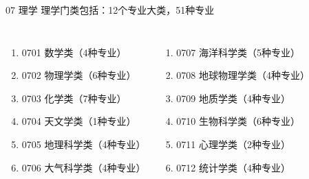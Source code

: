 \documentclass[aspectratio=169]{ctexbeamer} %
\begin{document}
\begin{frame}[t]{07 理学}
理学门类包括：12个专业大类，51种专业 \\

\begin{spacing}{1.2} %
\begin{columns}
{\large
\begin{enumerate}[label={\arabic*.}]
\item 0701 数学类（4种专业）
\item 0702 物理学类（6种专业）
\item 0703 化学类（7种专业）
\item 0704 天文学类（1种专业）
\item 0705 地理科学类（4种专业）
\item 0706 大气科学类（4种专业）
\end{enumerate} 
}
{\large
\begin{enumerate}[label={\arabic*.},start=7]
\item 0707 海洋科学类（5种专业）
\item 0708 地球物理学类（4种专业）
\item 0709 地质学类（4种专业）
\item 0710 生物科学类（6种专业）
\item 0711 心理学类（2种专业）
\item 0712 统计学类（4种专业）
\end{enumerate} 
}
\end{columns}
\end{spacing}
\end{frame}
\end{document}
